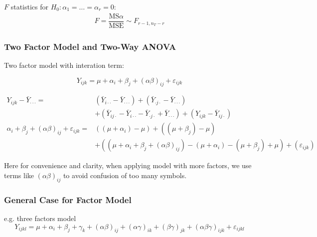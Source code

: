     $ F $ statistics for $ H_0:\alpha _1=\ldots=\alpha _r=0 $:
    \begin{align}
        F=\dfrac{\mathrm{MS}\alpha }{\mathrm{MSE} } \sim F_{r-1,n_T-r}
    \end{align}




\subsubsection{Two Factor Model and Two-Way ANOVA}

Two factor model with interation term:

\[
    Y_{ijk}=\mu +\alpha _i+\beta _j+(\alpha \beta )_{ij}+\varepsilon _{ijk} 
\]



\begin{align}
    Y_{ijk}-\bar{Y}_{\cdot \cdot \cdot }=&\left(\bar{Y}_{i\cdot \cdot}-\bar{Y}_{\cdot \cdot \cdot}\right)+\left(\bar{Y}_{\cdot j\cdot }-\bar{Y}_{\cdot \cdot \cdot }\right)\\
    &+\left(\bar{Y}_{ij\cdot }-\bar{Y}_{i\cdot \cdot }-\bar{Y}_{\cdot j\cdot }+\bar{Y}_{\cdot \cdot \cdot }\right)+  \left( Y_{ijk}-\bar{Y}_{ij\cdot}\right)\\
    \alpha _i+\beta _j+(\alpha \beta )_{ij}+\varepsilon _{ijk}=&\left((\mu +\alpha _i)-\mu \right)+\left((\mu +\beta _j)-\mu \right)\\
    &+\left( (\mu +\alpha _i+\beta _j+(\alpha \beta )_{ij})-(\mu +\alpha _i)-(\mu +\beta _j)+\mu  \right)+\left(\varepsilon _{ijk}\right)
    \end{align}
    
    
    
    
    
    Here for convenience and clarity, when applying model with more factors, we use terms like $ (\alpha \beta )_{ij} $ to avoid confusion of too many symbols.


\subsubsection{General Case for Factor Model}

e.g. three factors model 
\[
    Y_{ijkl} = \mu +\alpha _i +\beta _j+\gamma _k +(\alpha \beta )_{ij}+(\alpha \gamma )_{ik}+(\beta \gamma )_{jk}+(\alpha \beta \gamma )_{ijk}+\varepsilon _{ijkl}
\]


